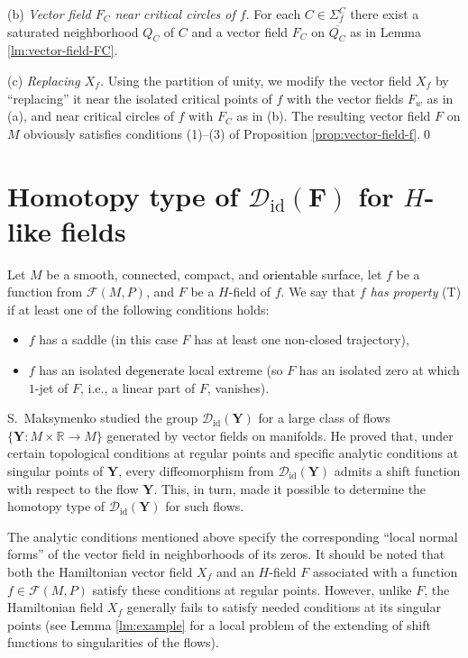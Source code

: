 \documentclass[10pt,reqno]{amsart}
\newcommand{\bfF}{\mathbf{F}}
\newcommand{\F}{\mathcal{F}(M,P)}
\newcommand{\id}{\mathrm{id}}
\newcommand{\Crit}{\Sigma_f}
\newcommand{\CritC}{\Crit^C}
\newcommand{\textr}[1]{\textcolor{black}{#1}}
\begin{document}
(b) {\it Vector field $F_C$ near  critical circles of $f$}. 
For each $C\in \CritC$ there exist a saturated neighborhood $Q_C$ of $C$ and a vector field $F_C$ on $\overline{Q_C}$ as in Lemma \ref{lm:vector-field-FC}.

(c) {\it Replacing $X_f$.} 
Using the partition of unity, we  modify the vector field $X_f$ by ``replacing'' it near the isolated critical points of $f$ with the vector fields $F_w$ as in (a), and near critical circles of $f$ with $F_C$ as in (b).
The resulting vector field $F$ on $M$ obviously satisfies conditions (1)--(3) of Proposition \ref{prop:vector-field-f}.\qed


 \section{Homotopy type of $\mathcal{D}_{\id}(\bfF)$ for  $H$-like fields}\label{sec:Hom-type-DidF}
 Let $M$ be a smooth, connected, compact, and  \textr{orientable} surface, let
 $f$ be a function from $\F$, and $F$ be a $H$-field of $f$. We  say that {\it $f$ has  property} (T) if at least one of the following conditions holds:
\begin{itemize}
	\item $f$ has a saddle (in this case $F$ has at least one non-closed trajectory),
	\item $f$ has  an isolated \textr{degenerate} local extreme (so $F$ has an isolated zero at which $1$-jet of $F$, i.e., a linear part of $F$, vanishes).
\end{itemize}

 
S.~Maksymenko \cite{Maksymenko:OsakaJM:2011} studied the group $\mathcal{D}_{\id}(\mathbf{Y})$ for a large class of flows $\{\mathbf{Y}: M \times \mathbb{R} \to M\}$ generated by vector fields on manifolds.
He proved that, under certain topological conditions at regular points and specific analytic conditions at singular points of $\mathbf{Y}$, every diffeomorphism from $\mathcal{D}_{\id}(\mathbf{Y})$ admits a shift function with respect to the flow $\mathbf{Y}$. This, in turn, made it possible to determine the homotopy type of $\mathcal{D}_{\id}(\mathbf{Y})$ for such flows.

The analytic conditions mentioned above specify the corresponding ``local normal forms'' of the vector field in neighborhoods of its zeros.
It should be noted that both the Hamiltonian vector field $X_f$ and an $H$-field $F$ associated with a function $f \in \F$ satisfy these conditions at regular points. However, unlike $F$, the Hamiltonian field $X_f$ generally fails to satisfy needed conditions at its singular points (see   Lemma \ref{lm:example}  for a local problem of the extending of  shift functions to singularities of the flows).
\end{document}
